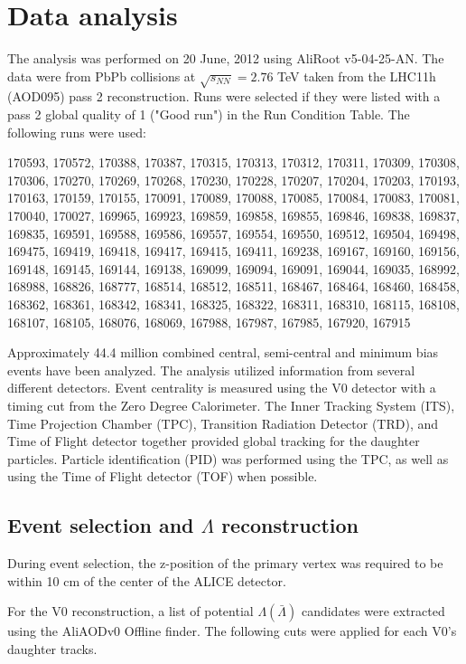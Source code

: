 \section{Data analysis}

The analysis was performed on 20 June, 2012 using AliRoot v5-04-25-AN. The data were from PbPb collisions at $\sqrt{s_{NN}}=2.76$  TeV taken from the LHC11h (AOD095) pass 2 reconstruction. Runs were selected if they were listed with a pass 2 global quality of 1 ("Good run") in the Run Condition Table. The following runs were used:

170593, 170572, 170388, 170387, 170315, 170313, 170312, 170311, 170309, 170308, 170306, 170270, 170269, 170268, 170230, 170228, 170207, 170204, 170203, 170193, 170163, 170159, 170155, 170091, 170089, 170088, 170085, 170084, 170083, 170081, 170040, 170027, 169965, 169923, 169859, 169858, 169855, 169846, 169838, 169837, 169835, 169591, 169588, 169586, 169557, 169554, 169550, 169512, 169504, 169498, 169475, 169419, 169418, 169417, 169415, 169411, 169238, 169167, 169160, 169156, 169148, 169145, 169144, 169138, 169099, 169094, 169091, 169044, 169035, 168992, 168988, 168826, 168777, 168514, 168512, 168511, 168467, 168464, 168460, 168458, 168362, 168361, 168342, 168341, 168325, 168322, 168311, 168310, 168115, 168108, 168107, 168105, 168076, 168069, 167988, 167987, 167985, 167920, 167915

Approximately 44.4 million combined central, semi-central and minimum bias events have been analyzed. The analysis utilized information from several different detectors.  Event centrality is measured using the V0 detector with a timing cut from the Zero Degree Calorimeter.  The Inner Tracking System (ITS), Time Projection Chamber (TPC), Transition Radiation Detector (TRD), and Time of Flight detector together provided global tracking for the daughter particles.  Particle identification (PID) was performed using the TPC, as well as using the Time of Flight detector (TOF) when possible.

\subsection{Event selection and $\Lambda$ reconstruction}
\label{sec:Recon}

During event selection, the z-position of the primary vertex was required to be within 10 cm of the center of the ALICE detector.  

For the V0 reconstruction, a list of potential $\Lambda(\bar{\Lambda})$ candidates were extracted using the AliAODv0 Offline finder. The following cuts were applied for each V0's daughter tracks.

